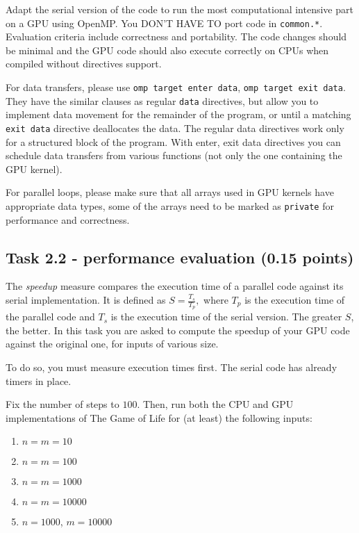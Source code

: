 \documentclass[a4paper, 11pt]{article}
\begin{document}
	Adapt the serial version of the code to run the most computational intensive part on a GPU using OpenMP. You DON'T HAVE TO port code in \texttt{common.*}. Evaluation criteria include correctness and portability. The code changes should be minimal and the GPU code should also execute correctly on CPUs when compiled without directives support. 
	
	For data transfers, please use \texttt{omp target enter data}, \texttt{omp target exit data}. They have the similar clauses as regular \texttt{data} directives, but allow you to implement data movement for the remainder of the program, or until a matching \texttt{exit data} directive deallocates the data. The regular data directives work only for a structured block of the program. With enter, exit data directives you can schedule data transfers from various functions (not only the one containing the GPU kernel). 

	For parallel loops, please make sure that all arrays used in GPU kernels have appropriate data types, some of the arrays need to be marked as \texttt{private} for performance and correctness. 

        \subsection{Task 2.2 - performance evaluation (0.15 points)} 

	        The \emph{speedup} measure compares the execution time of a parallel code against its serial implementation. It is defined as
        \begin{math}
        S = \frac{T_s}{T_p},
        \end{math}
        where $T_p$ is the execution time of the parallel code and $T_s$ is the execution time of the serial version. The greater $S$, the better.
        In this task you are asked to compute the speedup of your GPU code against the original one, for inputs of various size.

        To do so, you must measure execution times first. The serial code has already timers in place.  

        Fix the number of steps to $100$. Then, run both the CPU and GPU implementations of The Game of Life for (at least) the following inputs:
        \begin{enumerate}
                \item $n = m = 10$
                \item $n = m = 100$
                \item $n = m = 1000$
                \item $n = m = 10000$
                \item $n = 1000$, $m = 10000$
        \end{enumerate}
\end{document}
